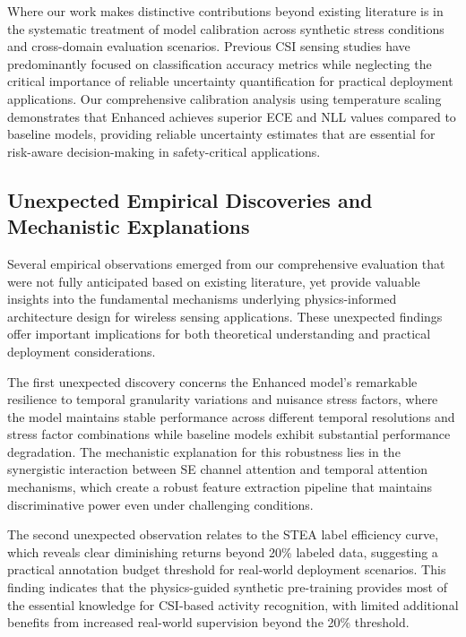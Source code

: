 \documentclass[journal]{IEEEtran}
\begin{document}
Where our work makes distinctive contributions beyond existing literature is in the systematic treatment of model calibration across synthetic stress conditions and cross-domain evaluation scenarios. Previous CSI sensing studies have predominantly focused on classification accuracy metrics while neglecting the critical importance of reliable uncertainty quantification for practical deployment applications. Our comprehensive calibration analysis using temperature scaling~\cite{calibration_guo2017} demonstrates that Enhanced achieves superior ECE and NLL values compared to baseline models, providing reliable uncertainty estimates that are essential for risk-aware decision-making in safety-critical applications.

\subsection{Unexpected Empirical Discoveries and Mechanistic Explanations}

Several empirical observations emerged from our comprehensive evaluation that were not fully anticipated based on existing literature, yet provide valuable insights into the fundamental mechanisms underlying physics-informed architecture design for wireless sensing applications. These unexpected findings offer important implications for both theoretical understanding and practical deployment considerations.

The first unexpected discovery concerns the Enhanced model's remarkable resilience to temporal granularity variations and nuisance stress factors, where the model maintains stable performance across different temporal resolutions and stress factor combinations while baseline models exhibit substantial performance degradation. The mechanistic explanation for this robustness lies in the synergistic interaction between SE channel attention and temporal attention mechanisms, which create a robust feature extraction pipeline that maintains discriminative power even under challenging conditions.

The second unexpected observation relates to the STEA label efficiency curve, which reveals clear diminishing returns beyond 20\% labeled data, suggesting a practical annotation budget threshold for real-world deployment scenarios. This finding indicates that the physics-guided synthetic pre-training provides most of the essential knowledge for CSI-based activity recognition, with limited additional benefits from increased real-world supervision beyond the 20\% threshold.
\end{document}
